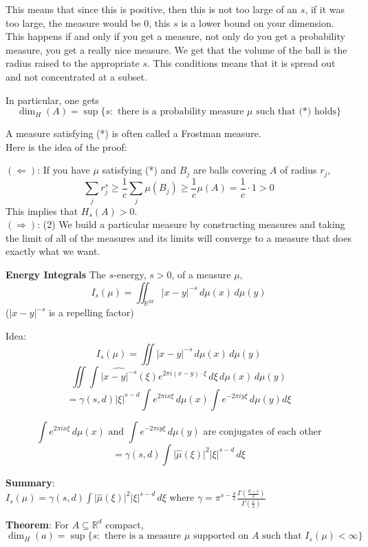 \documentclass[12pt]{article}
\begin{document}
\noindent This means that since this is positive, then this is not too large of an $s$, if it was too large, the measure would be 0, this $s$ is a lower bound on your dimension. This happens if and only if you get a measure, not only do you get a probability measure, you get a really nice measure. We get that the volume of the ball is the radius raised to the appropriate $s$. This conditions means that it is spread out and not concentrated at a subset.

In particular, one gets
$$\dim_H(A) = \sup \{ s: \text{ there is a probability measure } \mu \text{ such that (*) holds} \}$$

A measure satisfying (*) is often called a Frostman measure. \\

Here is the idea of the proof:

\noindent $(\Leftarrow)$: If you have $\mu$ satisfying (*) and $B_j$ are balls covering $A$ of radius $r_j$,
$$\sum_j r_j^s \geq \frac{1}{c} \sum_j \mu(B_j) \geq \frac{1}{c} \mu(A) = \frac{1}{c} \cdot 1  > 0$$
This implies that $H_s(A) > 0$.  \\

\noindent $(\Rightarrow)$: (2) We build a particular measure by constructing measures and taking the limit of all of the measures and its limits will converge to a measure that does exactly what we want.

\noindent \textbf{Energy Integrals}
The $s$-energy, $s>0$, of a measure $\mu$,
$$I_s(\mu) = \iint_{\mathbb{R}^{2d}} \vert x - y\vert^{-s} \, d\mu(x) \, d\mu(y)$$
($\vert x- y \vert^{-s}$ is a repelling factor)

Idea: 
$$I_s(\mu)= \iint \vert x - y\vert^{-s} \, d\mu(x) \, d\mu(y)$$
$$\iint \int \widehat{\vert x-y \vert^{-s}}(\xi) e^{2\pi i (x-y) \cdot \xi} \, d\xi \, d\mu(x) \, d\mu(y)$$
$$= \gamma(s,d) \vert \xi \vert^{s-d} \int e^{2\pi i x \xi} \, d\mu(x) \int e^{-2\pi i y \xi} \, d\mu(y) d \xi$$

$$\int e^{2\pi i x \xi} \, d\mu(x) \text{ and } \int e^{-2\pi i y \xi} \, d\mu(y) \text{ are conjugates of each other} $$
$$= \gamma(s,d) \int \vert \hat{\mu}(\xi)\vert^2 \vert \xi \vert^{s-d} \, d\xi$$

\noindent \textbf{Summary}: \\
\noindent $I_s(\mu) = \gamma(s,d) \int \vert \hat{\mu}(\xi)\vert^2 \vert \xi \vert^{s-d} \, d\xi$ where $\gamma = \pi^{s-\frac{d}{2}} \frac{\Gamma(\frac{d-s}{2})}{\Gamma(\frac{s}{2})}$

\noindent \textbf{Theorem}: For $A \subseteq \mathbb{R}^d$ compact,
$$\dim_H(a) = \sup \{ s: \text{ there is a measure } \mu \text{ supported on } A \text{ such that } I_s(\mu)<\infty\}$$
\end{document}
